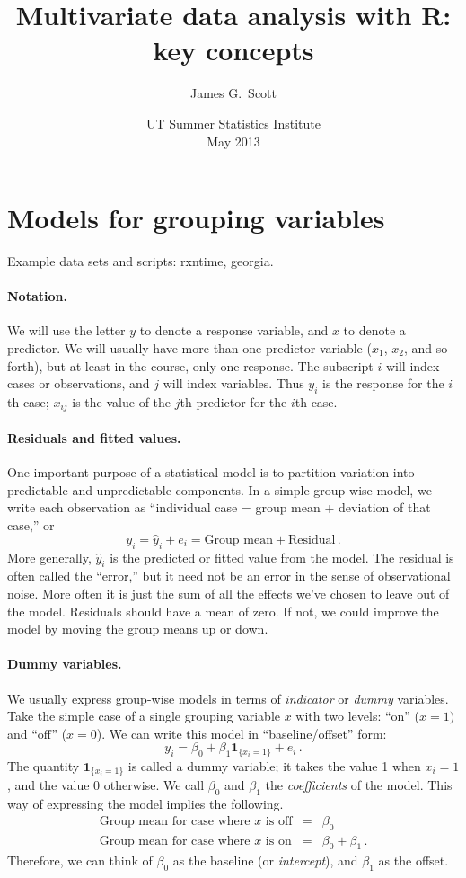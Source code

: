 \documentclass[11pt]{article}
\title{Multivariate data analysis with R: key concepts}
\author{ James G.~Scott}
\date{UT Summer Statistics Institute\\May 2013}  %
\newcommand{\1}[1]{\mathbf{1}_{\{ {#1} \}}}
\begin{document}

\maketitle%


\section{Models for grouping variables}
Example data sets and scripts: rxntime, georgia.

\paragraph{Notation.} We will use the letter $y$ to denote a response variable, and $x$ to denote a predictor.  We will usually have more than one predictor variable ($x_1$, $x_2$, and so forth), but at least in the course, only one response.  The subscript $i$ will index cases or observations, and $j$ will index variables.  Thus $y_i$ is the response for the $i$th case; $x_{ij}$ is the value of the $j$th predictor for the $i$th case.

\paragraph{Residuals and fitted values.}  One important purpose of a statistical model is to partition variation into predictable and unpredictable components.  In a simple group-wise model, we write each observation as ``individual case = group mean + deviation of that case,'' or
$$
y_i = \hat{y}_i + e_i = \mbox{Group mean} + \mbox{Residual} \, .
$$
More generally, $\hat{y}_i$ is the predicted or fitted value from the model.  The residual is often called the ``error,'' but it need not be an error in the sense of observational noise.  More often it is just the sum of all the effects we've chosen to leave out of the model.  Residuals should have a mean of zero.  If not, we could improve the model by moving the group means up or down.

\paragraph{Dummy variables.}  We usually express group-wise models in terms of \textit{indicator} or \textit{dummy} variables.  Take the simple case of a single grouping variable $x$ with two levels: ``on'' ($x=1)$ and ``off'' ($x=0$).  We can write this model in ``baseline/offset'' form:
$$
y_i = \beta_0 + \beta_1 \1{x_i=1} + e_i \, .
$$
The quantity $\1{x_i=1}$ is called a dummy variable; it takes the value 1 when $x_i=1$, and the value 0 otherwise.   We call $\beta_0$ and $\beta_1$ the \textit{coefficients} of the model.  This way of expressing the model implies the following.
\begin{eqnarray*}
\mbox{Group mean for case where $x$ is off} &=& \beta_0 \\
\mbox{Group mean for case where $x$ is on} &=& \beta_0 + \beta_1 \, .
\end{eqnarray*}
Therefore, we can think of $\beta_0$ as the baseline (or \textit{intercept}), and $\beta_1$ as the offset.
\end{document}
